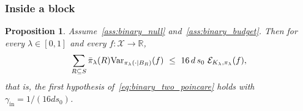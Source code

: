 \documentclass[aos]{imsart}%
\newcommand{\ambientspace}[0]{\mathcal{X}}
\newcommand{\bbR}[0]{\mathbb{R}}
\newcommand{\Var}{\mathrm{Var}}
\theoremstyle{plain}
\newtheorem{proposition}{Proposition}[section]
\theoremstyle{definition}
\begin{document}
    \subsubsection{Inside a block}

    \begin{proposition}
        \label{prop:binary_within}
        Assume~\ref{ass:binary_null}
        and~\ref{ass:binary_budget}. Then for every $\lambda\in[0,1]$ and every
        $f:\ambientspace\to\bbR$,
        \begin{equation}
            \label{eq:binary_within}
            \sum_{R\subseteq S}\bar\pi_\lambda(R)
            \Var_{\pi_\lambda(\cdot\mid B_R)}(f)
            \ \leq\ 16\,d\,s_0\ \Dir_{K_\lambda,\pi_\lambda}(f),
        \end{equation}
        that is, the first hypothesis of~\eqref{eq:binary_two_poincare} holds
        with $\gamma_{\mathrm{in}}=1/(16ds_0)$.
    \end{proposition}
\end{document}
